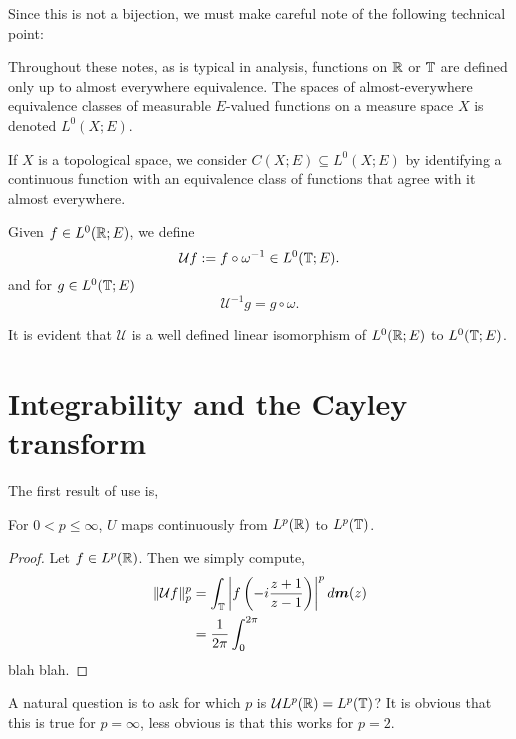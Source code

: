 \documentclass{unswmaths}
\begin{document}
Since this is not a bijection, we
must make careful note of the following technical point:

\begin{remark}
    Throughout these notes, as is typical in analysis, functions on $\mathbb{R}$ or $\mathbb{T}$
    are defined only up to almost everywhere equivalence. The spaces of almost-everywhere
    equivalence classes of measurable $E$-valued functions on a measure space $X$
    is denoted $L^0(X;E)$. 
    
    If $X$ is a topological space, we consider $C(X;E) \subseteq L^0(X;E)$ by identifying
    a continuous function with an equivalence class of functions that agree with it almost everywhere.
\end{remark}

Given $f \in L^0(\mathbb{R};E)$, we define
\begin{equation*}
    \mathcal{U}f := f\circ \omega^{-1} \in L^0(\mathbb{T};E).
\end{equation*}
and for $g \in L^0(\mathbb{T};E)$
\begin{equation*}
    \mathcal{U}^{-1} g = g\circ \omega.
\end{equation*}

It is evident that $\mathcal{U}$ is a well defined linear isomorphism of $L^0(\mathbb{R};E)$ to $L^0(\mathbb{T};E)$. 

\section*{Integrability and the Cayley transform}
The first result of use is,
\begin{lemma}
    For $0 < p \leq \infty$, $U$ maps continuously from $L^p(\mathbb{R})$ to $L^p(\mathbb{T})$. 
\end{lemma}
\begin{proof}
    Let $f \in L^p(\mathbb{R})$. Then we simply compute,
    \begin{align*}
        \|\mathcal{U}f\|_p^p &= \int_{\mathbb{T}} \left|f\left(-i\frac{z+1}{z-1}\right)\right|^p d\boldsymbol{m}(z)\\
        &= \frac{1}{2\pi} \int_0^{2\pi} 
    \end{align*}
    blah blah.
\end{proof}

A natural question is to ask for which $p$ is $\mathcal{U}L^p(\mathbb{R}) = L^p(\mathbb{T})$? It is obvious
that this is true for $p = \infty$, less obvious is that this works for $p = 2$.
\end{document}
